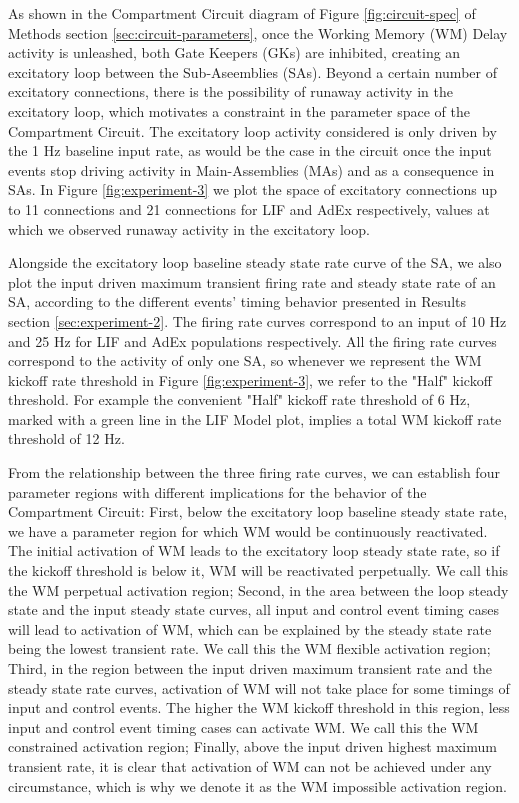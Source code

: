 \documentclass[10pt]{article}
\begin{document}
As shown in the Compartment Circuit diagram of Figure \ref{fig:circuit-spec} of Methods section \ref{sec:circuit-parameters}, once the Working Memory (WM) Delay activity is unleashed, both Gate Keepers (GKs) are inhibited, creating an excitatory loop between the Sub-Aseemblies (SAs).
Beyond a certain number of excitatory connections, there is the possibility of runaway activity in the excitatory loop, which motivates a constraint in the parameter space of the Compartment Circuit.
The excitatory loop activity considered is only driven by the 1 Hz baseline input rate, as would be the case in the circuit once the input events stop driving activity in Main-Assemblies (MAs) and as a consequence in SAs.
In Figure \ref{fig:experiment-3} we plot the space of excitatory connections up to 11 connections and 21 connections for LIF and AdEx respectively, values at which we observed runaway activity in the excitatory loop.

Alongside the excitatory loop baseline steady state rate curve of the SA, we also plot the input driven maximum transient firing rate and steady state rate of an SA, according to the different events' timing behavior presented in Results section \ref{sec:experiment-2}.
The firing rate curves correspond to an input of 10 Hz and 25 Hz for LIF and AdEx populations respectively.
All the firing rate curves correspond to the activity of only one SA, so whenever we represent the WM kickoff rate threshold in Figure \ref{fig:experiment-3}, we refer to the "Half" kickoff threshold.
For example the convenient "Half" kickoff rate threshold of 6 Hz, marked with a green line in the LIF Model plot, implies a total WM kickoff rate threshold of 12 Hz.

From the relationship between the three firing rate curves, we can establish four parameter regions with different implications for the behavior of the Compartment Circuit:
First, below the excitatory loop baseline steady state rate, we have a parameter region for which WM would be continuously reactivated.
The initial activation of WM leads to the excitatory loop steady state rate, so if the kickoff threshold is below it, WM will be reactivated perpetually.
We call this the WM perpetual activation region;
Second, in the area between the loop steady state and the input steady state curves, all input and control event timing cases will lead to activation of WM, which can be explained by the steady state rate being the lowest transient rate.
We call this the WM flexible activation region;
Third, in the region between the input driven maximum transient rate and the steady state rate curves, activation of WM will not take place for some timings of input and control events.
The higher the WM kickoff threshold in this region, less input and control event timing cases can activate WM.
We call this the WM constrained activation region;
Finally, above the input driven highest maximum transient rate, it is clear that activation of WM can not be achieved under any circumstance, which is why we denote it as the WM impossible activation region.
\end{document}
